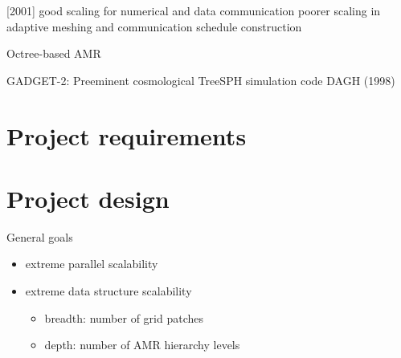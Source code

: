 \documentclass{article}
\begin{document}
   [2001]
   good scaling for numerical and data communication
   poorer scaling in adaptive meshing and communication schedule construction 


  Octree-based AMR

GADGET-2: Preeminent cosmological TreeSPH simulation code
DAGH (1998)

\section{Project requirements}

\section{Project design}

General goals

\begin{itemize}
\item extreme parallel scalability
\item extreme data structure scalability
  \begin{itemize}
  \item breadth: number of grid patches
  \item depth: number of AMR hierarchy levels
  \end{itemize}
\end{itemize}
\end{document}
